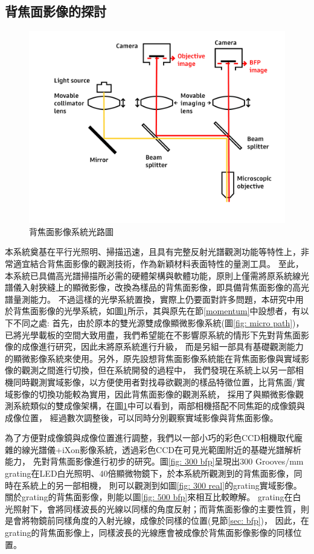 \documentclass[12pt]{article}
\begin{document}
\subsection{背焦面影像的探討}
\begin{figure}
    \centering
    \includegraphics[width = 0.9\linewidth]{lightPath3.jpg}
    \caption{背焦面影像系統光路圖}
    \label{fig: bfp path}
\end{figure}
本系統奠基在平行光照明、掃描迅速，且具有完整反射光譜觀測功能等特性上，非常適宜結合背焦面影像的觀測技術，作為新穎材料表面特性的量測工具。
至此，本系統已具備高光譜掃描所必需的硬體架構與軟體功能，原則上僅需將原系統線光譜儀入射狹縫上的顯微影像，改換為樣品的背焦面影像，即具備背焦面影像的高光譜量測能力。
不過這樣的光學系統置換，實際上仍要面對許多問題，本研究中用於背焦面影像的光學系統，如圖\ref{fig: bfp path}所示，其與原先在節\ref{momentum}中設想者，有以下不同之處:
首先，由於原本的雙光源雙成像顯微影像系統(圖\ref{fig: micro path})，已將光學載板的空間大致用盡，我們希望能在不影響原系統的情形下先對背焦面影像的成像進行研究，因此未將原系統進行升級，
而是另組一部具有基礎觀測能力的顯微影像系統來使用。另外，原先設想背焦面影像系統能在背焦面影像與實域影像的觀測之間進行切換，但在系統開發的過程中，
我們發現在系統上以另一部相機同時觀測實域影像，以方便使用者對找尋欲觀測的樣品特徵位置，比背焦面/實域影像的切換功能較為實用，因此背焦面影像的觀測系統，
採用了與顯微影像觀測系統類似的雙成像架構，在圖\ref{fig: bfp path}中可以看到，兩部相機搭配不同焦距的成像鏡與成像位置，
經過數次調整後，可以同時分別觀察實域影像與背焦面影像。

為了方便對成像鏡與成像位置進行調整，我們以一部小巧的彩色CCD相機取代龐雜的線光譜儀+iXon影像系統，透過彩色CCD在可見光範圍附近的基礎光譜解析能力，
先對背焦面影像進行初步的研究。圖\ref{fig: 300 bfp}呈現出300 Grooves/mm grating在LED白光照明、40倍顯微物鏡下，於本系統所觀測到的背焦面影像，同時在系統上的另一部相機，
則可以觀測到如圖\ref{fig: 300 real}的grating實域影像。關於grating的背焦面影像，則能以圖\ref{fig: 500 bfp}來相互比較瞭解。
grating在白光照射下，會將同樣波長的光線以同樣的角度反射；而背焦面影像的主要性質，則是會將物鏡前同樣角度的入射光線，成像於同樣的位置(見節\ref{sec: bfp})，
因此，在grating的背焦面影像上，同樣波長的光線應會被成像於背焦面影像影像的同樣位置。\cite{inproceedings}
\end{document}
